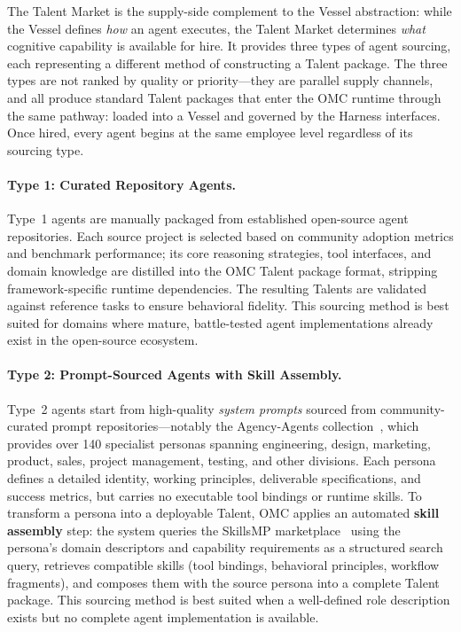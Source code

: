 The Talent Market is the supply-side complement to the Vessel abstraction: while the Vessel defines \emph{how} an agent executes, the Talent Market determines \emph{what} cognitive capability is available for hire. It provides three types of agent sourcing, each representing a different method of constructing a Talent package. The three types are not ranked by quality or priority---they are parallel supply channels, and all produce standard Talent packages that enter the OMC runtime through the same pathway: loaded into a Vessel and governed by the Harness interfaces. Once hired, every agent begins at the same employee level regardless of its sourcing type.

\paragraph{Type 1: Curated Repository Agents.}
Type~1 agents are manually packaged from established open-source agent repositories. Each source project is selected based on community adoption metrics and benchmark performance; its core reasoning strategies, tool interfaces, and domain knowledge are distilled into the OMC Talent package format, stripping framework-specific runtime dependencies. The resulting Talents are validated against reference tasks to ensure behavioral fidelity. This sourcing method is best suited for domains where mature, battle-tested agent implementations already exist in the open-source ecosystem.

\paragraph{Type 2: Prompt-Sourced Agents with Skill Assembly.}
Type~2 agents start from high-quality \emph{system prompts} sourced from community-curated prompt repositories---notably the Agency-Agents collection~\cite{agencyagents}, which provides over 140 specialist personas spanning engineering, design, marketing, product, sales, project management, testing, and other divisions. Each persona defines a detailed identity, working principles, deliverable specifications, and success metrics, but carries no executable tool bindings or runtime skills. To transform a persona into a deployable Talent, OMC applies an automated \textbf{skill assembly} step: the system queries the SkillsMP marketplace~\cite{skillsmp} using the persona’s domain descriptors and capability requirements as a structured search query, retrieves compatible skills (tool bindings, behavioral principles, workflow fragments), and composes them with the source persona into a complete Talent package. This sourcing method is best suited when a well-defined role description exists but no complete agent implementation is available.

